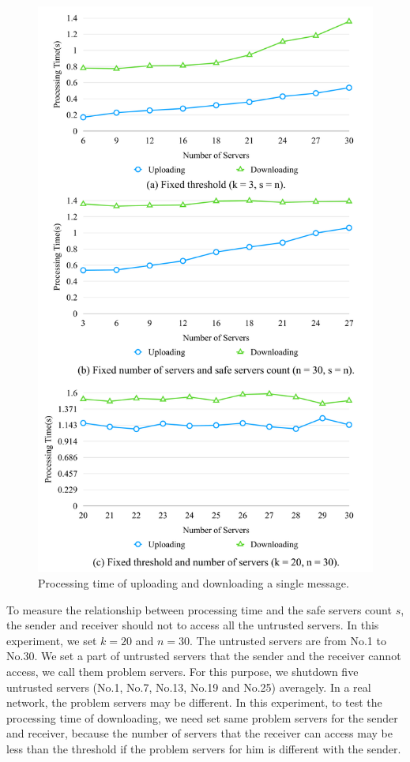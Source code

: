 \documentclass[a4paper,11pt]{report}
\begin{document}
\begin{figure}[H]
	\centering
	\includegraphics[scale=0.17]{constant_parameter}
	\caption{Processing time of uploading and downloading a single message.}
	\label{fig:constant_parameter}
\end{figure}

To measure the relationship between processing time and the safe servers count $s$, the sender and receiver should not to access all the untrusted servers.
In this experiment, we set $k = 20$ and $n = 30$.
The untrusted servers are from No.1 to No.30.
We set a part of untrusted servers that the sender and the receiver cannot access, we call them problem servers.
For this purpose, we shutdown five untrusted servers (No.1, No.7, No.13, No.19 and No.25) averagely.
In a real network, the problem servers may be different.
In this experiment, to test the processing time of downloading, we need set same problem servers for the sender and receiver, because the number of servers that the receiver can access may be less than the threshold if the problem servers for him is different with the sender.
\end{document}
